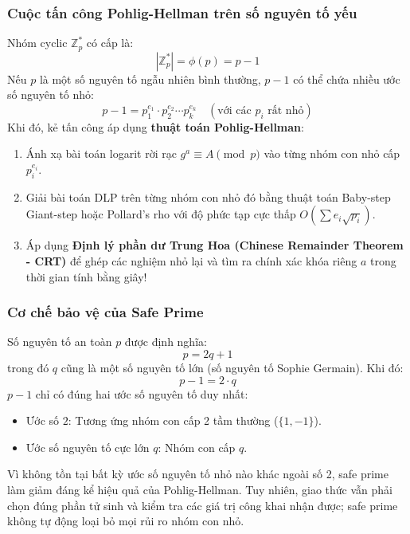 \documentclass[12pt,a4paper]{article}
\theoremstyle{plain}
\begin{document}
\subsubsection{Cuộc tấn công Pohlig-Hellman trên số nguyên tố yếu}
Nhóm cyclic $\mathbb{Z}_p^*$ có cấp là:
\begin{equation}
|\mathbb{Z}_p^*| = \phi(p) = p - 1
\end{equation}
Nếu $p$ là một số nguyên tố ngẫu nhiên bình thường, $p - 1$ có thể chứa nhiều ước số nguyên tố nhỏ:
\begin{equation}
p - 1 = p_1^{e_1} \cdot p_2^{e_2} \cdots p_k^{e_k} \quad (\text{với các } p_i \text{ rất nhỏ})
\end{equation}
Khi đó, kẻ tấn công áp dụng \textbf{thuật toán Pohlig-Hellman}:
\begin{enumerate}
    \item Ánh xạ bài toán logarit rời rạc $g^a \equiv A \pmod p$ vào từng nhóm con nhỏ cấp $p_i^{e_i}$.
    \item Giải bài toán DLP trên từng nhóm con nhỏ đó bằng thuật toán Baby-step Giant-step hoặc Pollard's rho với độ phức tạp cực thấp $O(\sum e_i \sqrt{p_i})$.
    \item Áp dụng \textbf{Định lý phần dư Trung Hoa (Chinese Remainder Theorem - CRT)} để ghép các nghiệm nhỏ lại và tìm ra chính xác khóa riêng $a$ trong thời gian tính bằng giây!
\end{enumerate}

\subsubsection{Cơ chế bảo vệ của Safe Prime}
Số nguyên tố an toàn $p$ được định nghĩa:
\begin{equation}
p = 2q + 1
\end{equation}
trong đó $q$ cũng là một số nguyên tố lớn (số nguyên tố Sophie Germain). Khi đó:
\begin{equation}
p - 1 = 2 \cdot q
\end{equation}
$p - 1$ chỉ có đúng hai ước số nguyên tố duy nhất:
\begin{itemize}
    \item Ước số $2$: Tương ứng nhóm con cấp 2 tầm thường ($\{1, -1\}$).
    \item Ước số nguyên tố cực lớn $q$: Nhóm con cấp $q$.
\end{itemize}
Vì không tồn tại bất kỳ ước số nguyên tố nhỏ nào khác ngoài số 2, safe prime làm giảm đáng kể hiệu quả của Pohlig-Hellman. Tuy nhiên, giao thức vẫn phải chọn đúng phần tử sinh và kiểm tra các giá trị công khai nhận được; safe prime không tự động loại bỏ mọi rủi ro nhóm con nhỏ.
\end{document}
